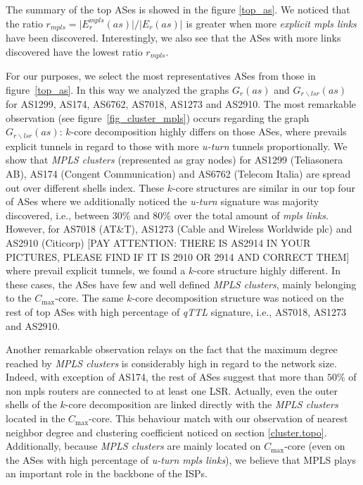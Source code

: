 The summary of the top ASes is showed in the figure \ref{top_as}. 
We noticed that the ratio $r_{mpls}= \vert E^{mpls}_{r} (as) \vert /\vert E_{r} (as) \vert $  is greater when more  \textit{explicit mpls links} have been discovered. 
Interestingly, we also see that the ASes with more links discovered have the lowest ratio $r_{mpls}$. 

For our purposes, we select the most representatives ASes from those in figure~\ref{top_as}.
In this way we analyzed the graphs $G_{r}(as)$ and $G_{r\backslash lsr}(as)$ for AS1299, AS174, AS6762, AS7018, AS1273 and AS2910. 
The most remarkable observation (see figure~\ref{fig_cluster_mpls}) occurs regarding the graph $G_{r\backslash lsr}(as)$: $k$-core decomposition highly differs on those ASes, where prevails explicit tunnels in regard to those with more \textit{u-turn} tunnels proportionally. 
We show that \textit{MPLS clusters} (represented as gray nodes) for  AS1299 (Teliasonera AB), AS174 (Congent Communication) and AS6762 (Telecom Italia) are spread out over different shells index. 
These $k$-core structures are similar in our top four of ASes where we additionally noticed  the \textit{u-turn} signature was majority discovered, i.e., between $30\%$ and  $80\%$ over  the total amount of \textit{mpls links}. 
However, for AS7018 (AT\&T), AS1273 (Cable and Wireless Worldwide plc) and AS2910 (Citicorp) [PAY ATTENTION: THERE IS AS2914 IN YOUR PICTURES, PLEASE FIND IF IT IS 2910 OR 2914 AND CORRECT THEM] where prevail explicit tunnels, we found a $k$-core structure highly different.  
In these cases,  the ASes have few and well defined \textit{MPLS clusters}, mainly belonging to the $C_{\max}$-core. 
The same $k$-core decomposition structure was noticed  on the rest of top ASes with high percentage of \textit{qTTL} signature, i.e., AS7018, AS1273 and AS2910.

Another remarkable observation  relays on the fact that the maximum degree reached by \textit{MPLS clusters} is considerably high in regard to the network size. 
Indeed, with exception of AS174, the rest of ASes suggest that more than $50\%$ of non mpls routers are connected  to at least one LSR. 
Actually, even the outer shells of the $k$-core decomposition are linked directly with the \textit{MPLS clusters} located in the $C_{\max}$-core. 
This behaviour match with our observation of nearest neighbor degree and clustering coefficient noticed on section \ref{cluster.topo}. 
Additionally, because \textit{MPLS clusters} are mainly located on $C_{\max}$-core (even on the ASes with high percentage of \textit{u-turn mpls links}), we believe that MPLS plays an important role in the backbone of the ISPs.


